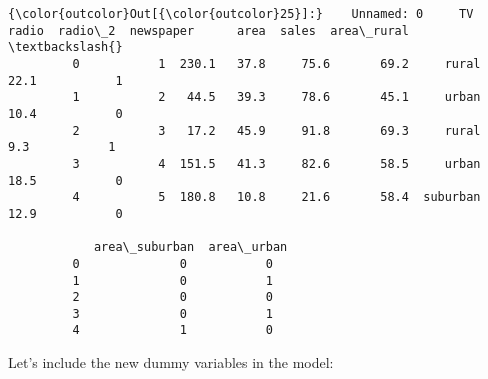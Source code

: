 \documentclass[11pt]{article}
\begin{document}
\begin{Verbatim}[commandchars=\\\{\}]
{\color{outcolor}Out[{\color{outcolor}25}]:}    Unnamed: 0     TV  radio  radio\_2  newspaper      area  sales  area\_rural  \textbackslash{}
         0           1  230.1   37.8     75.6       69.2     rural   22.1           1   
         1           2   44.5   39.3     78.6       45.1     urban   10.4           0   
         2           3   17.2   45.9     91.8       69.3     rural    9.3           1   
         3           4  151.5   41.3     82.6       58.5     urban   18.5           0   
         4           5  180.8   10.8     21.6       58.4  suburban   12.9           0   
         
            area\_suburban  area\_urban  
         0              0           0  
         1              0           1  
         2              0           0  
         3              0           1  
         4              1           0  
\end{Verbatim}
            
    Let's include the new dummy variables in the model:
\end{document}
